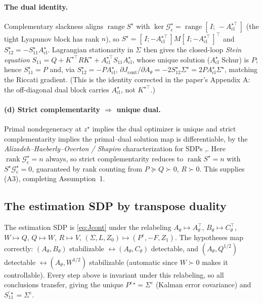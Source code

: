 \documentclass[11pt]{article}
\theoremstyle{definition}
\DeclareMathOperator{\rank}{rank}
\DeclareMathOperator{\range}{range}
\newcommand{\Acl}{A_{\mathrm{cl}}}
\newcommand{\Th}{\theta}
\newcommand{\half}{{1/2}}
\newcommand{\Pe}{P^{\varepsilon}}
\begin{document}
\paragraph{The dual identity.}
Complementary slackness aligns $\range S^\star$ with
$\ker\mathcal G_{\mathrm c}^\star=\range[\,I;\,-\Acl^{\star\top}\,]$ (the tight
Lyapunov block has rank $n$), so $S^\star=[\,I;-\Acl^{\star\top}\,]M[\,I;-\Acl^{\star
\top}\,]^\top$ and $S_{12}^\star=-S_{11}^\star\Acl^\star$. Lagrangian stationarity in
$\Sigma$ then gives the closed-loop \emph{Stein equation}
$S_{11}=Q+K^{\star\top}RK^\star+\Acl^{\star\top}S_{11}\Acl^\star$, whose unique
solution ($\Acl^\star$ Schur) is $P$; hence $S_{11}^\star=P$ and, via
$S_{12}^\star=-P\Acl^\star$, $\partial J_{\mathrm{cont}}/\partial A_\Th=-2S_{12}^\star
\Sigma^\star=2P\Acl^\star\Sigma^\star$, matching the Riccati gradient. (This is the
identity corrected in the paper's Appendix A: the off-diagonal dual block carries
$\Acl^\star$, not $K^{\star\top}$.)

\paragraph{(d) Strict complementarity $\Rightarrow$ unique dual.}
Primal nondegeneracy at $z^\star$ implies the dual optimizer is unique and strict
complementarity implies the primal--dual solution map is differentiable, by the
\emph{Alizadeh--Haeberly--Overton / Shapiro} characterization for SDPs
\cite[Thms.~10,15]{AHO},\cite[Thm.~4.1]{Shapiro97}. Here $\rank\mathcal
G_{\mathrm c}^\star=n$ always, so strict complementarity reduces to $\rank
S^\star=n$ with $S^\star\mathcal G_{\mathrm c}^\star=0$, guaranteed by rank counting
from $P\succeq Q\succ0$, $R\succ0$. This supplies (A3), completing Assumption~1.

\subsection{The estimation SDP by transpose duality}\label{sec:lqg-est}
The estimation SDP is \eqref{eq:Jcont} under the relabeling
$A_\Th\mapsto A_\Th^\top$, $B_\Th\mapsto C_\Th^\top$, $W\mapsto Q$, $Q\mapsto W$,
$R\mapsto V$, $(\Sigma,L,Z_0)\mapsto(\Pe,-F,Z_1)$. The hypotheses map correctly:
$(A_\Th,B_\Th)$ stabilizable $\leftrightarrow(A_\Th,C_\Th)$ detectable, and
$(A_\Th,Q^{\half})$ detectable $\leftrightarrow(A_\Th,W^{\half})$ stabilizable
(automatic since $W\succ0$ makes it controllable). Every step above is invariant
under this relabeling, so all conclusions transfer, giving the unique
$\Pe{}^\star=\Sigma^\varepsilon$ (Kalman error covariance) and $S_{11}^{\prime\star}=
\Sigma^\varepsilon$.
\end{document}
